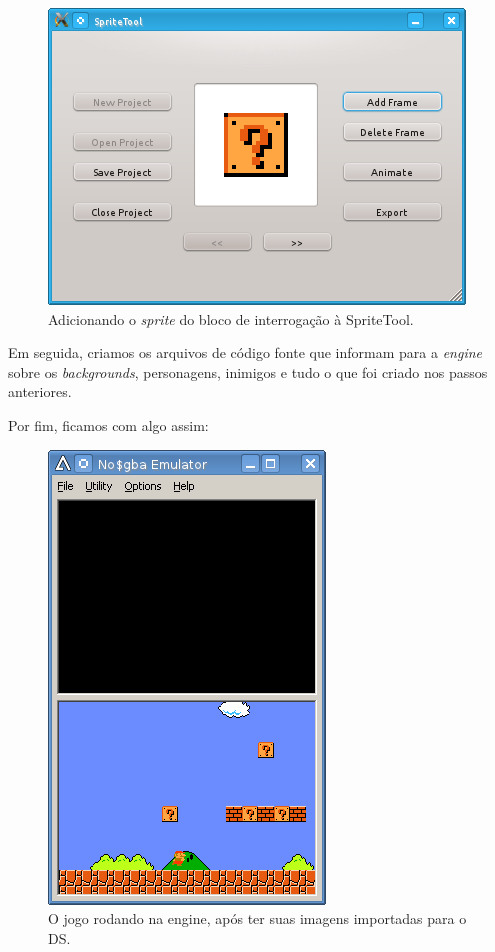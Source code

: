 \documentclass[brazil]{abnt}
\begin{document}
\begin{figure}[h!]
\centering
\includegraphics{imgs/spritetool3.png}
\caption{Adicionando o \textit{sprite} do bloco de interrogação à SpriteTool.}
\label{fig:itembox}
\end{figure}

Em seguida, criamos os arquivos de código fonte que informam para a \textit{engine} sobre os \textit{backgrounds}, personagens, inimigos e tudo o que foi criado nos passos anteriores.



Por fim, ficamos com algo assim:

\begin{figure}[h!]
\centering
\includegraphics{imgs/nocash1.png}
\caption{O jogo rodando na engine, após ter suas imagens importadas para o DS.}
\end{figure}
\end{document}
